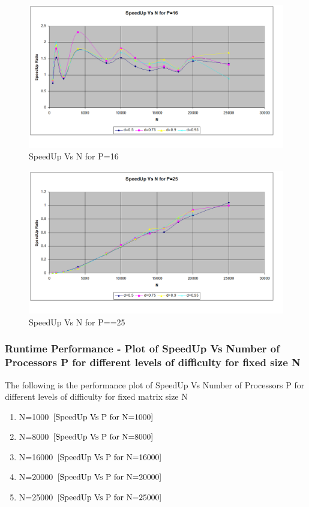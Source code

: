 \documentclass[twoside,11pt]{article}\usepackage{amsmath,amsfonts,amsthm,fullpage}
\begin{document}
\begin{figure}[!htbp]
\centering
\includegraphics[scale=.46]{charts/speedup_n_d_p_16} 
\caption{SpeedUp Vs N for P=16}
\label{SpeedUp Vs N for P=16}
\end{figure}

\begin{figure}[!htbp]
\centering
\includegraphics[scale=.46]{charts/speedup_n_d_p_25} 
\caption{SpeedUp Vs N for P==25}
\label{SpeedUp Vs N for P==25}
\end{figure}



\pagebreak
\subsubsection{Runtime Performance - Plot of SpeedUp Vs Number of Processors P for different levels of difficulty for fixed size N}
The following is the performance plot of SpeedUp Vs Number of Processors P for different levels of difficulty for fixed matrix size N

\begin{enumerate}
\item
N=1000 $\eqref{SpeedUp Vs P for N=1000}$
\item
N=8000 $\eqref{SpeedUp Vs P for N=8000}$
\item
N=16000 $\eqref{SpeedUp Vs P for N=16000}$
\item
N=20000 $\eqref{SpeedUp Vs P for N=20000}$
\item
N=25000 $\eqref{SpeedUp Vs P for N=25000}$
\end{enumerate}
\end{document}
